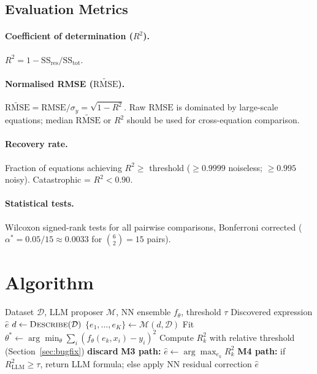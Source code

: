 \documentclass[twoside,11pt]{article}
\newcommand{\Rsq}{R^{2}}
\newcommand{\rmse}{\ensuremath{\mathrm{RMSE}}}
\newcommand{\nrmse}{\ensuremath{\widetilde{\mathrm{RMSE}}}}
\begin{document}
\subsection{Evaluation Metrics}
\label{sec:methods:metrics}

\paragraph{Coefficient of determination ($\Rsq$).}
$\Rsq = 1 - \mathrm{SS}_{\mathrm{res}} / \mathrm{SS}_{\mathrm{tot}}$.

\paragraph{Normalised RMSE ($\nrmse$).}
$\nrmse = \rmse/\sigma_y = \sqrt{1 - \Rsq}$.
Raw \rmse{} is dominated by large-scale equations; median \nrmse{} or $\Rsq$
should be used for cross-equation comparison.

\paragraph{Recovery rate.}
Fraction of equations achieving $\Rsq \geq $ threshold ($\geq 0.9999$
noiseless; $\geq 0.995$ noisy).  Catastrophic = $\Rsq < 0.90$.

\paragraph{Statistical tests.}
Wilcoxon signed-rank tests for all pairwise comparisons, Bonferroni corrected
($\alpha^* = 0.05/15 \approx 0.0033$ for $\binom{6}{2}=15$ pairs).

\section{Algorithm}
\label{sec:algorithm}

\begin{algorithm}[ht]
\caption{HypatiaX hybrid symbolic discovery (M3/M4 core loop)}
\label{alg:hds}
\begin{algorithmic}[1]
\REQUIRE Dataset $\mathcal{D}$, LLM proposer $\mathcal{M}$,
         NN ensemble $f_\theta$, threshold $\tau$
\ENSURE  Discovered expression $\hat{e}$
\STATE $d \leftarrow \textsc{Describe}(\mathcal{D})$
\STATE $\{e_1,\dots,e_K\} \leftarrow \mathcal{M}(d, \mathcal{D})$
  \STATE Fit $\theta^* \leftarrow \arg\min_\theta \sum_i (f_\theta(e_k,x_i)-y_i)^2$
  \STATE Compute $\Rsq_k$ with relative threshold (Section~\ref{sec:bugfix})
    \STATE \textbf{discard}
  \ENDIF
\ENDFOR
\STATE \textbf{M3 path:} $\hat{e} \leftarrow \arg\max_{e_k} \Rsq_k$
\STATE \textbf{M4 path:} if $\Rsq_{\text{LLM}} \geq \tau$, return LLM formula;
       else apply NN residual correction
\RETURN $\hat{e}$
\end{algorithmic}
\end{algorithm}
\end{document}
